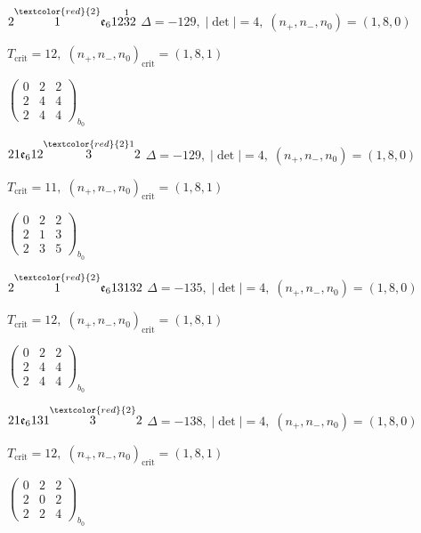 \documentclass[10pt]{article}
\begin{document}
$2\overset{\textcolor{red}{2}}{1}\mathfrak{e}_612\overset{1}{3}2$ \quad $\Delta=-129,\; |\det|=4,\; (n_+,n_-,n_0)=(1,8,0)$

\hspace{1em}$T_{\text{crit}}=12,\; (n_+,n_-,n_0)_{\text{crit}}=(1,8,1)$

\hspace{2em}$\left(\begin{smallmatrix}0 & 2 & 2 \\ 2 & 4 & 4 \\ 2 & 4 & 4\end{smallmatrix}\right)_{\!b_0}$

$21\mathfrak{e}_612\overset{\textcolor{red}{2}1}{3}2$ \quad $\Delta=-129,\; |\det|=4,\; (n_+,n_-,n_0)=(1,8,0)$

\hspace{1em}$T_{\text{crit}}=11,\; (n_+,n_-,n_0)_{\text{crit}}=(1,8,1)$

\hspace{2em}$\left(\begin{smallmatrix}0 & 2 & 2 \\ 2 & 1 & 3 \\ 2 & 3 & 5\end{smallmatrix}\right)_{\!b_0}$

\smallskip

$2\overset{\textcolor{red}{2}}{1}\mathfrak{e}_613132$ \quad $\Delta=-135,\; |\det|=4,\; (n_+,n_-,n_0)=(1,8,0)$

\hspace{1em}$T_{\text{crit}}=12,\; (n_+,n_-,n_0)_{\text{crit}}=(1,8,1)$

\hspace{2em}$\left(\begin{smallmatrix}0 & 2 & 2 \\ 2 & 4 & 4 \\ 2 & 4 & 4\end{smallmatrix}\right)_{\!b_0}$

$21\mathfrak{e}_6131\overset{\textcolor{red}{2}}{3}2$ \quad $\Delta=-138,\; |\det|=4,\; (n_+,n_-,n_0)=(1,8,0)$

\hspace{1em}$T_{\text{crit}}=12,\; (n_+,n_-,n_0)_{\text{crit}}=(1,8,1)$

\hspace{2em}$\left(\begin{smallmatrix}0 & 2 & 2 \\ 2 & 0 & 2 \\ 2 & 2 & 4\end{smallmatrix}\right)_{\!b_0}$
\end{document}
